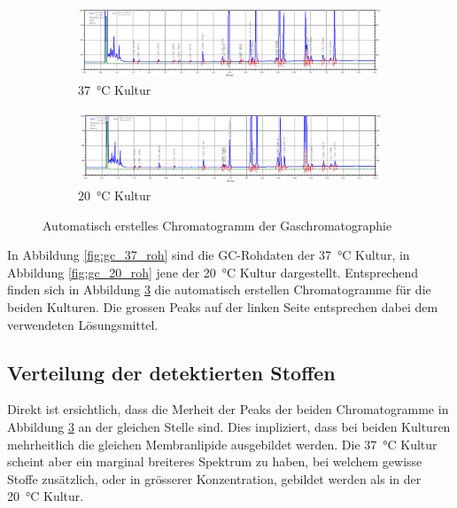 \documentclass[a4paper,english]{scrreprt}
\begin{document}
\begin{figure}
	\centering
	\begin{subfigure}{\textwidth}
		\includegraphics[width=\linewidth]{img/gc_37_chromatogramm.png}
		\caption{\SI{37}{\celsius} Kultur}
		\label{fig:gc_37_chromatogramm}
	\end{subfigure}
	\begin{subfigure}{\textwidth}
		\includegraphics[width=\linewidth]{img/gc_20_chromatogramm.png}
		\caption{\SI{20}{\celsius} Kultur}
		\label{fig:gc_20_chromatogramm}
	\end{subfigure}
	\caption{Automatisch erstelles Chromatogramm der Gaschromatographie}
	\label{fig:gc_chromatogramm}
\end{figure}


In Abbildung \ref{fig:gc_37_roh} sind die GC-Rohdaten der \SI{37}{\celsius}
Kultur, in Abbildung \ref{fig:gc_20_roh} jene der \SI{20}{\celsius} Kultur
dargestellt. Entsprechend finden sich in Abbildung \ref{fig:gc_chromatogramm}
die automatisch erstellen Chromatogramme für die beiden Kulturen. Die grossen
Peaks auf der linken Seite entsprechen dabei dem verwendeten Lösungsmittel.

\subsection{Verteilung der detektierten Stoffen}

Direkt ist ersichtlich, dass die Merheit der Peaks der beiden Chromatogramme in
Abbildung \ref{fig:gc_chromatogramm} an der gleichen Stelle sind. Dies
impliziert, dass bei beiden Kulturen mehrheitlich die gleichen Membranlipide
ausgebildet werden. Die \SI{37}{\celsius} Kultur scheint aber ein marginal
breiteres Spektrum zu haben, bei welchem gewisse Stoffe zusätzlich, oder in
grösserer Konzentration, gebildet werden als in der \SI{20}{\celsius} Kultur.
\end{document}
